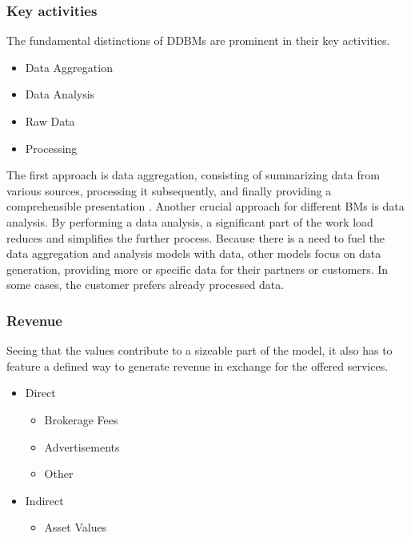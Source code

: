 \subsubsection{Key activities}

The fundamental distinctions of \gls{DDBM}s are prominent in their key activities. 

\begin{itemize}
    \item Data Aggregation
    \item Data Analysis
    \item Raw Data
    \item Processing
\end{itemize}

The first approach is data aggregation, consisting of summarizing data from various sources, processing it subsequently, and finally providing a comprehensible presentation \cite{data_aggregation}.
Another crucial approach for different \gls{BM}s is data analysis. By performing a data analysis, a significant part of the work load reduces and simplifies the further process.
Because there is a need to fuel the data aggregation and analysis models with data, other models focus on data generation, providing more or specific data for their partners or customers. 
In some cases, the customer prefers already processed data. 

\subsubsection{Revenue}

Seeing that the values contribute to a sizeable part
of the model, it also has to feature a defined way to
generate revenue in exchange for the offered services.

\begin{itemize}
    \item Direct
    \begin{itemize}
        \item Brokerage Fees
        \item Advertisements
        \item Other
    \end{itemize}
    \item Indirect 
    \begin{itemize}
        \item Asset Values
    \end{itemize} 
\end{itemize}

